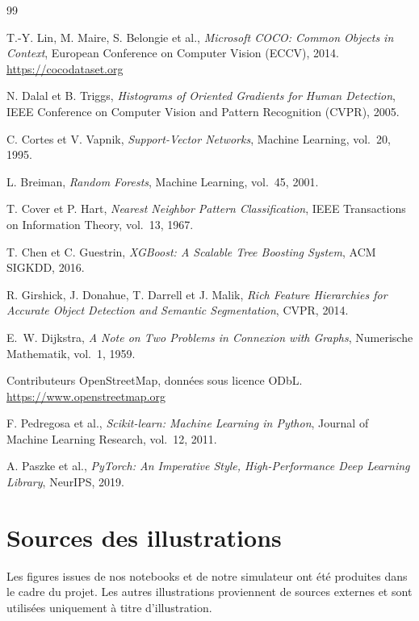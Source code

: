 \begin{thebibliography}{99}

 T.-Y. Lin, M. Maire, S. Belongie et al., \emph{Microsoft COCO: Common Objects in Context}, European Conference on Computer Vision (ECCV), 2014. \url{https://cocodataset.org}

 N. Dalal et B. Triggs, \emph{Histograms of Oriented Gradients for Human Detection}, IEEE Conference on Computer Vision and Pattern Recognition (CVPR), 2005.

 C. Cortes et V. Vapnik, \emph{Support-Vector Networks}, Machine Learning, vol.~20, 1995.

 L. Breiman, \emph{Random Forests}, Machine Learning, vol.~45, 2001.

 T. Cover et P. Hart, \emph{Nearest Neighbor Pattern Classification}, IEEE Transactions on Information Theory, vol.~13, 1967.

 T. Chen et C. Guestrin, \emph{XGBoost: A Scalable Tree Boosting System}, ACM SIGKDD, 2016.

 R. Girshick, J. Donahue, T. Darrell et J. Malik, \emph{Rich Feature Hierarchies for Accurate Object Detection and Semantic Segmentation}, CVPR, 2014.

 E.~W. Dijkstra, \emph{A Note on Two Problems in Connexion with Graphs}, Numerische Mathematik, vol.~1, 1959.

 Contributeurs OpenStreetMap, données sous licence ODbL. \url{https://www.openstreetmap.org}

 F. Pedregosa et al., \emph{Scikit-learn: Machine Learning in Python}, Journal of Machine Learning Research, vol.~12, 2011.

 A. Paszke et al., \emph{PyTorch: An Imperative Style, High-Performance Deep Learning Library}, NeurIPS, 2019.
\end{thebibliography}

\appendix

\chapter{Sources des illustrations}
\label{annexe:sources}

Les figures issues de nos notebooks et de notre simulateur ont été produites dans le cadre du projet. Les autres illustrations proviennent de sources externes et sont utilisées uniquement à titre d'illustration.

